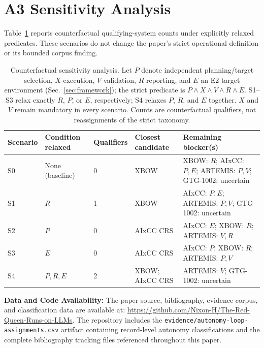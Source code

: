 \documentclass[conference,compsoc]{IEEEtran}
\begin{document}
\vspace{6pt}
\section{A3 Sensitivity Analysis}
\label{app:sensitivity}
Table~\ref{tab:sensitivity} reports counterfactual qualifying-system counts under explicitly
relaxed predicates. These scenarios do not change the paper's strict operational definition or
its bounded corpus finding.

\begin{table}[!ht]
\centering
\small
\caption{Counterfactual sensitivity analysis. Let $P$ denote independent planning/target
selection, $X$ execution, $V$ validation, $R$ reporting, and $E$ an E2 target environment
(Sec.~\ref{sec:framework}); the strict predicate is $P\land X\land V\land R\land E$.
S1--S3 relax exactly $R$, $P$, or $E$, respectively; S4 relaxes $P$, $R$, and $E$ together.
$X$ and $V$ remain mandatory in every scenario. Counts are counterfactual qualifiers, not
reassignments of the strict taxonomy.}
\label{tab:sensitivity}
\small
\setlength{\tabcolsep}{4.5pt}
\begin{tabular}{@{}lllll@{}}
\toprule
Scenario & Condition relaxed & Qualifiers & Closest candidate & Remaining blocker(s) \\
\midrule
S0 & None (baseline) & 0 & XBOW & XBOW: $R$; AIxCC: $P,E$;
ARTEMIS: $P,V$; GTG-1002: uncertain \\
S1 & $R$ & 1 & XBOW & AIxCC: $P,E$; ARTEMIS: $P,V$; GTG-1002: uncertain \\
S2 & $P$ & 0 & AIxCC CRS & AIxCC: $E$; XBOW: $R$; ARTEMIS: $V,R$ \\
S3 & $E$ & 0 & AIxCC CRS & AIxCC: $P$; XBOW: $R$; ARTEMIS: $P,V$ \\
S4 & $P,R,E$ & 2 & XBOW; AIxCC CRS & ARTEMIS: $V$; GTG-1002: uncertain \\
\bottomrule
\end{tabular}
\end{table}

\FloatBarrier

\twocolumn
\renewcommand{\baselinestretch}{0.80}\selectfont



\vspace{2pt}
\noindent\textbf{Data and Code Availability:} The paper source, bibliography, evidence corpus, and classification data are available at:
\url{https://github.com/Nixon-H/The-Red-Queen-Runs-on-LLMs}.
The repository includes the \texttt{evidence/autonomy-loop-assignments.csv} artifact
containing record-level autonomy classifications and the complete bibliography tracking
files referenced throughout this paper.
\end{document}
